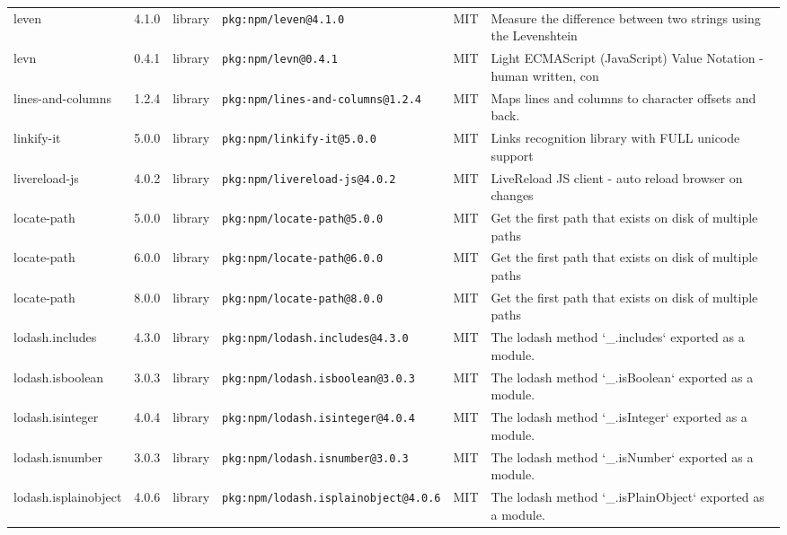 \documentclass[11pt,a4paper]{article}
\begin{document}
\begin{longtable}{|p{4cm}|p{2cm}|p{1.6cm}|p{5cm}|p{1.5cm}|p{3.5cm}|}
\raggedright leven & 4.1.0 & library & \small\texttt{pkg:npm/leven@4.1.0} & MIT & \small Measure the difference between two strings using the Levenshtein  \\
\raggedright levn & 0.4.1 & library & \small\texttt{pkg:npm/levn@0.4.1} & MIT & \small Light ECMAScript (JavaScript) Value Notation - human written, con \\
\raggedright lines-and-columns & 1.2.4 & library & \small\texttt{pkg:npm/lines-and-columns@1.2.4} & MIT & \small Maps lines and columns to character offsets and back. \\
\raggedright linkify-it & 5.0.0 & library & \small\texttt{pkg:npm/linkify-it@5.0.0} & MIT & \small Links recognition library with FULL unicode support \\
\raggedright livereload-js & 4.0.2 & library & \small\texttt{pkg:npm/livereload-js@4.0.2} & MIT & \small LiveReload JS client - auto reload browser on changes \\
\raggedright locate-path & 5.0.0 & library & \small\texttt{pkg:npm/locate-path@5.0.0} & MIT & \small Get the first path that exists on disk of multiple paths \\
\raggedright locate-path & 6.0.0 & library & \small\texttt{pkg:npm/locate-path@6.0.0} & MIT & \small Get the first path that exists on disk of multiple paths \\
\raggedright locate-path & 8.0.0 & library & \small\texttt{pkg:npm/locate-path@8.0.0} & MIT & \small Get the first path that exists on disk of multiple paths \\
\raggedright lodash.includes & 4.3.0 & library & \small\texttt{pkg:npm/lodash.includes@4.3.0} & MIT & \small The lodash method `\_.includes` exported as a module. \\
\raggedright lodash.isboolean & 3.0.3 & library & \small\texttt{pkg:npm/lodash.isboolean@3.0.3} & MIT & \small The lodash method `\_.isBoolean` exported as a module. \\
\raggedright lodash.isinteger & 4.0.4 & library & \small\texttt{pkg:npm/lodash.isinteger@4.0.4} & MIT & \small The lodash method `\_.isInteger` exported as a module. \\
\raggedright lodash.isnumber & 3.0.3 & library & \small\texttt{pkg:npm/lodash.isnumber@3.0.3} & MIT & \small The lodash method `\_.isNumber` exported as a module. \\
\raggedright lodash.isplainobject & 4.0.6 & library & \small\texttt{pkg:npm/lodash.isplainobject@4.0.6} & MIT & \small The lodash method `\_.isPlainObject` exported as a module. \\

\end{longtable}
\end{document}
